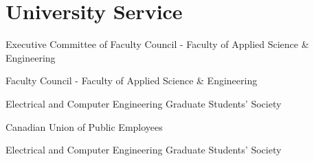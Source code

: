 \section{\sc University Service}

{
  Executive Committee of Faculty Council - Faculty of Applied Science \& Engineering
}

{
  Faculty Council - Faculty of Applied Science \& Engineering
}

{
  Electrical and Computer Engineering Graduate Students' Society
}

{
  Canadian Union of Public Employees
}

{
  Electrical and Computer Engineering Graduate Students' Society
}

